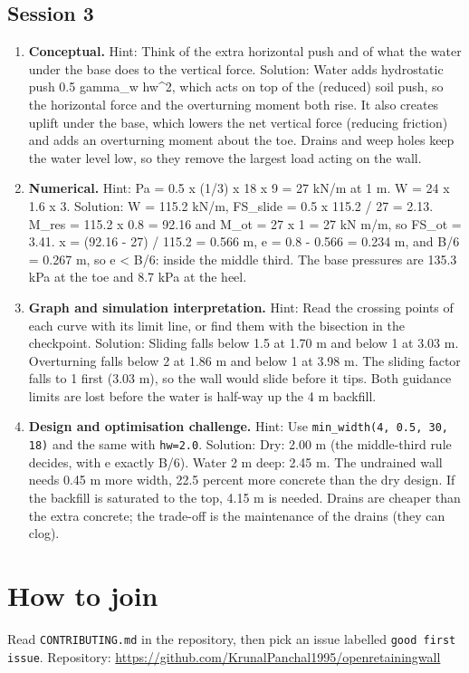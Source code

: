\documentclass[11pt,a4paper]{article}
\begin{document}
\subsection*{Session 3}
\begin{enumerate}[nosep]
\item \textbf{Conceptual.} Hint: Think of the extra horizontal push and of what the water under the base does to the vertical force. Solution: Water adds hydrostatic push 0.5 gamma\_w hw\textasciicircum{}2, which acts on top of the (reduced) soil push, so the horizontal force and the overturning moment both rise. It also creates uplift under the base, which lowers the net vertical force (reducing friction) and adds an overturning moment about the toe. Drains and weep holes keep the water level low, so they remove the largest load acting on the wall.
\item \textbf{Numerical.} Hint: Pa = 0.5 x (1/3) x 18 x 9 = 27 kN/m at 1 m. W = 24 x 1.6 x 3. Solution: W = 115.2 kN/m, FS\_slide = 0.5 x 115.2 / 27 = 2.13. M\_res = 115.2 x 0.8 = 92.16 and M\_ot = 27 x 1 = 27 kN m/m, so FS\_ot = 3.41. x = (92.16 - 27) / 115.2 = 0.566 m, e = 0.8 - 0.566 = 0.234 m, and B/6 = 0.267 m, so e \textless{} B/6: inside the middle third. The base pressures are 135.3 kPa at the toe and 8.7 kPa at the heel.
\item \textbf{Graph and simulation interpretation.} Hint: Read the crossing points of each curve with its limit line, or find them with the bisection in the checkpoint. Solution: Sliding falls below 1.5 at 1.70 m and below 1 at 3.03 m. Overturning falls below 2 at 1.86 m and below 1 at 3.98 m. The sliding factor falls to 1 first (3.03 m), so the wall would slide before it tips. Both guidance limits are lost before the water is half-way up the 4 m backfill.
\item \textbf{Design and optimisation challenge.} Hint: Use \texttt{min\_width(4, 0.5, 30, 18)} and the same with \texttt{hw=2.0}. Solution: Dry: 2.00 m (the middle-third rule decides, with e exactly B/6). Water 2 m deep: 2.45 m. The undrained wall needs 0.45 m more width, 22.5 percent more concrete than the dry design. If the backfill is saturated to the top, 4.15 m is needed. Drains are cheaper than the extra concrete; the trade-off is the maintenance of the drains (they can clog).
\end{enumerate}

\section{How to join}
Read \texttt{CONTRIBUTING.md} in the repository, then pick an issue labelled \texttt{good first issue}. Repository: \url{https://github.com/KrunalPanchal1995/openretainingwall}
\end{document}
